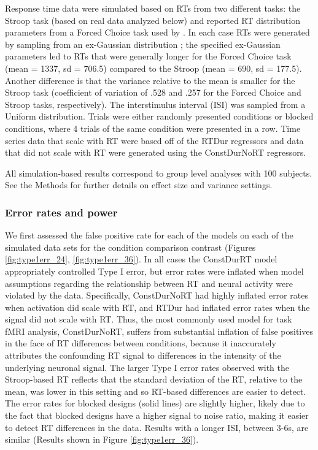 \documentclass[titlepage,12pt] {article}
\begin{document}
Response time data were simulated based on RTs from two different tasks: the Stroop task (based on real data analyzed below) and reported RT distribution parameters from a Forced Choice task used by \citet{grinband_detection_2008}.  In each case RTs were generated by sampling from an ex-Gaussian distribution \citep{Ratcliff1976RetrievalPI}; the specified ex-Gaussian parameters led to RTs that were generally longer for the Forced Choice task (mean = 1337, sd = 706.5) compared to the Stroop (mean = 690, sd = 177.5).  Another difference is that the variance relative to the mean is smaller for the Stroop task (coefficient of variation of .528 and .257 for the Forced Choice and Stroop tasks, respectively).   The interstimulus interval (ISI) was sampled from a Uniform distribution. Trials were either randomly presented conditions or blocked conditions, where 4 trials of the same condition were presented in a row.  Time series data that scale with RT were based off of the RTDur regressors and data that did not scale with RT were generated using the ConstDurNoRT regressors. 

All simulation-based results correspond to group level analyses with 100 subjects.  See the Methods for further details on effect size and variance settings.


\subsubsection*{Error rates and power}
 
 We first assessed the false positive rate for each of the models on each of the simulated data sets for the condition comparison contrast (Figures \ref{fig:type1err_24}, \ref{fig:type1err_36}). In all cases the ConstDurRT model appropriately controlled Type I error, but error rates were inflated when model assumptions regarding the relationship between RT and neural activity were violated by the data.  Specifically, ConstDurNoRT had highly inflated error rates when activation did scale with RT, and RTDur had inflated error rates when the signal did not  scale with RT.  Thus, the most commonly used model for task fMRI analysis, ConstDurNoRT, suffers from substantial inflation of false positives in the face of RT differences between conditions, because it inaccurately attributes the confounding RT signal to differences in the intensity of the underlying neuronal signal.  The larger Type I error rates observed with the Stroop-based RT reflects that the standard deviation of the RT, relative to the mean, was lower in this setting and so RT-based differences are easier to detect. The error rates for blocked designs (solid lines) are slightly higher, likely due to the fact that blocked designs have a higher signal to noise ratio, making it easier to detect RT differences in the data.  Results with a longer ISI, between 3-6s, are similar (Results shown in Figure \ref{fig:type1err_36}).
\end{document}

